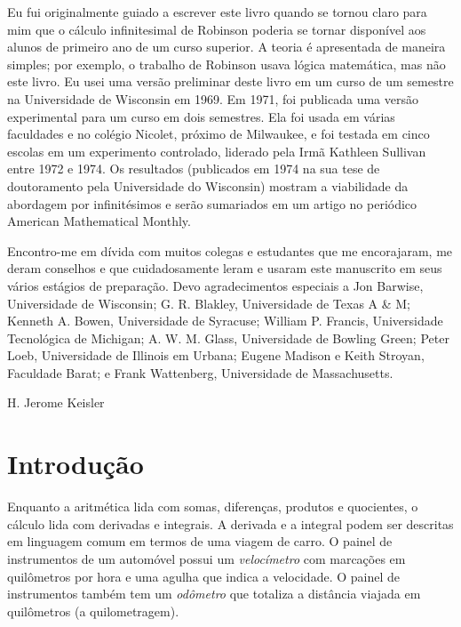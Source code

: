 \documentclass{svmono}
\begin{document}
Eu fui originalmente guiado a escrever este livro quando se tornou claro
para mim que o cálculo infinitesimal de Robinson poderia se tornar
disponível aos alunos de primeiro ano de um curso superior. A teoria é
apresentada de maneira simples; por exemplo, o trabalho de Robinson
usava lógica matemática, mas não este livro. Eu usei uma versão preliminar
deste livro em um curso de um semestre na Universidade de Wisconsin em
1969. Em 1971, foi publicada uma versão experimental para um curso em
dois semestres. Ela foi usada em várias faculdades e no colégio Nicolet,
próximo de Milwaukee, e foi testada em cinco escolas em um experimento
controlado, liderado pela Irmã Kathleen Sullivan entre 1972 e 1974. Os
resultados (publicados em 1974 na sua tese de doutoramento pela Universidade
do Wisconsin) mostram a viabilidade da abordagem por infinitésimos e serão
sumariados em um artigo no periódico American Mathematical Monthly.

Encontro-me em dívida com muitos colegas e estudantes que me encorajaram,
me deram conselhos e que cuidadosamente leram e usaram este manuscrito
em seus vários estágios de preparação. Devo agradecimentos especiais a
Jon Barwise, Universidade de Wisconsin; G. R. Blakley, Universidade de
Texas A \& M; Kenneth A. Bowen, Universidade de Syracuse; William P.
Francis, Universidade Tecnológica de Michigan; A. W. M. Glass,
Universidade de Bowling Green; Peter Loeb, Universidade de Illinois em
Urbana; Eugene Madison e Keith Stroyan, Faculdade Barat; e Frank Wattenberg,
Universidade de Massachusetts.

\hfill H. Jerome Keisler

\tableofcontents

\chapter*{Introdução}

Enquanto a aritmética lida com somas, diferenças, produtos e quocientes, o
cálculo lida com derivadas e integrais. A derivada e a integral podem
ser descritas em linguagem comum em termos de uma viagem de carro. O
painel de instrumentos de um automóvel possui um \emph{velocímetro}
com marcações em quilômetros por hora e uma agulha que indica a velocidade.
O painel de instrumentos também tem um \emph{odômetro} que totaliza a
distância viajada em quilômetros (a quilometragem).
\end{document}
